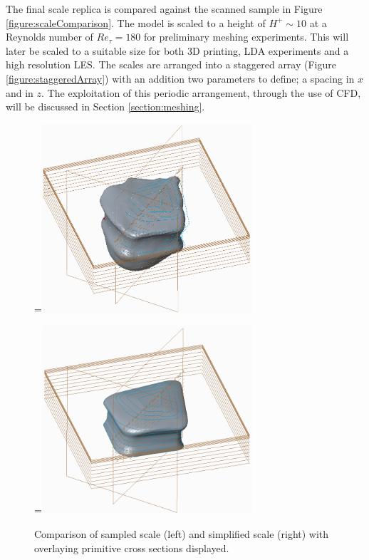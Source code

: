 \documentclass[12pt,oneside,a4paper]{article}
\newcommand*{\vcenteredhbox}[1]{\begingroup
\setbox0=\hbox{#1}\parbox{\wd0}{\box0}\endgroup}
\begin{document}
The final scale replica is compared against the scanned sample in Figure \ref{figure:scaleComparison}. The model is scaled to a height of $H^+ \sim 10$ at a Reynolds number of $Re_\tau = 180$ for preliminary meshing experiments. This will later be scaled to a suitable size for both 3D printing, LDA experiments and a high resolution LES. The scales are arranged into a staggered array (Figure \ref{figure:staggeredArray}) with an addition two parameters to define; a spacing in $x$ and in $z$. The exploitation of this periodic arrangement, through the use of CFD, will be discussed in Section \ref{section:meshing}.

\begin{figure}[!t]
\centering
\vcenteredhbox{\includegraphics[width=7.8cm]{images/Scale_Replication_3.PNG}}\hfill
\vcenteredhbox{\includegraphics[width=7.8cm]{images/Scale_Replication_9.PNG}}
\caption{Comparison of sampled scale (left) and simplified scale (right) with overlaying primitive cross sections displayed.}
\label{figure:blendedScale}
\end{figure}
\end{document}
